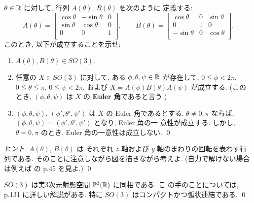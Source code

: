 \documentclass[12pt,twoside]{jarticle}
\begin{document}
\begin{question}
  $\theta \in {\mathbb R}$ に対して, 行列 $A(\theta)$, $B(\theta)$ を次のように
  定義する:
  \[
    A(\theta)
    =
    \begin{bmatrix}
      \cos \theta & - \sin \theta & 0 \\
      \sin \theta &   \cos \theta & 0 \\
           0      &   0           & 1 \\
    \end{bmatrix},
    \qquad
    B(\theta)
    =
    \begin{bmatrix}
        \cos \theta & 0 & \sin \theta \\
             0      & 1 &      0      \\
      - \sin \theta & 0 & \cos \theta \\
    \end{bmatrix}.
  \]
  このとき, 以下が成立することを示せ:
  \begin{enumerate}
  \item $A(\theta), B(\theta) \in SO(3)$.
  \item 任意の $X \in SO(3)$ に対して, %
    ある $\phi, \theta, \psi \in {\mathbb R}$ が存在して, %
    $0 \leqq \phi < 2\pi$, $0 \leqq \theta \leqq \pi$, $0 \leqq \psi < 2\pi$, 
    および $X = A(\phi)B(\theta)A(\psi)$ が成立する. %
    (このとき, $(\phi, \theta, \psi)$ は $X$ の {\bf Euler 角}であると言う.)
  \item $(\phi,\theta,\psi)$, $(\phi',\theta',\psi')$ は $X$ の Euler 
    角であるとする. $\theta \ne 0, \pi$ ならば, %
    $(\phi,\theta,\psi) = (\phi',\theta',\psi')$ となり, Euler 角の一
    意性が成立する. %
    しかし, $\theta = 0, \pi$ のとき, Euler 角の一意性は成立しない.
    \qed
  \end{enumerate}
\end{question}

\begin{proof}[ヒント]
$A(\theta)$, $B(\theta)$ は
それぞれ $z$ 軸および $y$ 軸のまわりの回転を表わす行列である. 
そのことに注意しながら図を描きながら考えよ.
(自力で解けない場合は例えば \cite{YS} の p.45 を見よ.)
\qed
\end{proof}

\begin{rem}
$SO(3)$ は実3次元射影空間 ${\mathbb P}^3({\mathbb R})$ に同相である. こ
の手のことについては, \cite{Yokota} p.131 に詳しい解説がある. 
特に $SO(3)$ はコンパクトかつ弧状連結である.
\qed
\end{rem}
\end{document}
